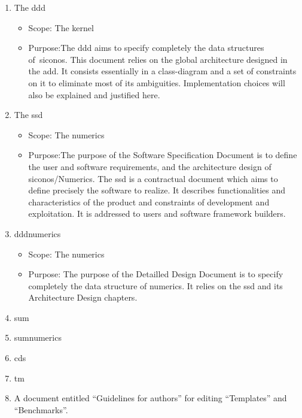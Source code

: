 \begin{enumerate}
\begin{itemize}
    \end{itemize}
  \item  The \acf{ddd}
    \begin{itemize}
    \item Scope:  The \ac{kernel}
    \item Purpose:The \ac{ddd} aims to specify completely the data structures of~\ac{siconos}. This document relies on the global architecture designed in the \ac{add}. It consists essentially in a class-diagram and a set of constraints on it to eliminate most of its ambiguities. Implementation choices will also be explained and justified here. 
    \end{itemize}
  \item  The \acf{ssd} 
  \begin{itemize}
    \item Scope: The \ac{numerics}
    \item Purpose:The purpose of the Software Specification Document is to define the user and software requirements, and the architecture design of \ac{siconos}/Numerics. The \ac{ssd} is a contractual document which aims to define precisely the software to realize. It describes functionalities and characteristics of the product and constraints of development and exploitation. It is addressed to users and software framework builders. 
    \end{itemize}
  \item  \acf{dddnumerics} 
    \begin{itemize}
    \item Scope: The \ac{numerics}
    \item Purpose: The purpose of the Detailled Design Document is to specify completely the data structure of \ac{numerics}. It relies on the \ac{ssd} and its Architecture Design chapters.
    \end{itemize}  
  \item \acf{sum}
  \item \acf{sumnumerics}
  \item \acf{cds}
  \item \acf{tm}
  \item  A document entitled ``Guidelines for  authors'' for editing ``Templates'' and ``Benchmarks''.
 \end{enumerate}